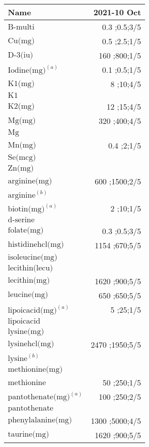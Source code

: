 \begin{table}[H]
\centering
\begin{tabular}{|l|r|}
\hline
Name&2021-10 Oct\\
\hline
$\textrm{B-multi}$&0.3 ;0.5;3/5\\
$\textrm{Cu(mg)}$&0.5 ;2.5;1/5\\
$\textrm{D-3(iu)}$&160 ;800;1/5\\
$\textrm{Iodine(mg)}^{\left(a\right)}$&0.1 ;0.5;1/5\\
$\textrm{K1(mg)}$&8 ;10;4/5\\
$\textrm{K1}$&\\
$\textrm{K2(mg)}$&12 ;15;4/5\\
$\textrm{Mg(mg)}$&320 ;400;4/5\\
$\textrm{Mg}$&\\
$\textrm{Mn(mg)}$&0.4 ;2;1/5\\
$\textrm{Se(mcg)}$&\\
$\textrm{Zn(mg)}$&\\
$\textrm{arginine(mg)}$&600 ;1500;2/5\\
$\textrm{arginine}^{\left(b\right)}$&\\
$\textrm{biotin(mg)}^{\left(a\right)}$&2 ;10;1/5\\
$\textrm{d-serine}$&\\
$\textrm{folate(mg)}$&0.3 ;0.5;3/5\\
$\textrm{histidinehcl(mg)}$&1154 ;670;5/5\\
$\textrm{isoleucine(mg)}$&\\
$\textrm{lecithin(lecu)}$&\\
$\textrm{lecithin(mg)}$&1620 ;900;5/5\\
$\textrm{leucine(mg)}$&650 ;650;5/5\\
$\textrm{lipoicacid(mg)}^{\left(a\right)}$&5 ;25;1/5\\
$\textrm{lipoicacid}$&\\
$\textrm{lysine(mg)}$&\\
$\textrm{lysinehcl(mg)}$&2470 ;1950;5/5\\
$\textrm{lysine}^{\left(b\right)}$&\\
$\textrm{methionine(mg)}$&\\
$\textrm{methionine}$&50 ;250;1/5\\
$\textrm{pantothenate(mg)}^{\left(a\right)}$&100 ;250;2/5\\
$\textrm{pantothenate}$&\\
$\textrm{phenylalanine(mg)}$&1300 ;5000;4/5\\
$\textrm{taurine(mg)}$&1620 ;900;5/5\\

\end{tabular}
\end{table}

